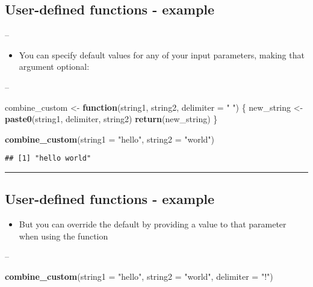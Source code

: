 \documentclass[]{article}
\newenvironment{Shaded}{\begin{snugshade}}{\end{snugshade}}
\newcommand{\ControlFlowTok}[1]{\textcolor[rgb]{0.13,0.29,0.53}{\textbf{#1}}}
\newcommand{\DataTypeTok}[1]{\textcolor[rgb]{0.13,0.29,0.53}{#1}}
\newcommand{\KeywordTok}[1]{\textcolor[rgb]{0.13,0.29,0.53}{\textbf{#1}}}
\newcommand{\NormalTok}[1]{#1}
\newcommand{\StringTok}[1]{\textcolor[rgb]{0.31,0.60,0.02}{#1}}
\providecommand{\tightlist}{%
  \setlength{\itemsep}{0pt}\setlength{\parskip}{0pt}}
\begin{document}
\hypertarget{user-defined-functions---example-2}{%
\subsection{User-defined functions -
example}\label{user-defined-functions---example-2}}

--

\begin{itemize}
\tightlist
\item
  You can specify default values for any of your input parameters,
  making that argument optional:
\end{itemize}

--

\begin{Shaded}
\begin{Highlighting}[]
\NormalTok{combine_custom <-}\StringTok{ }\ControlFlowTok{function}\NormalTok{(string1, string2, }\DataTypeTok{delimiter =} \StringTok{" "}\NormalTok{) \{}
\NormalTok{  new_string <-}\StringTok{ }\KeywordTok{paste0}\NormalTok{(string1, delimiter, string2)}
  \KeywordTok{return}\NormalTok{(new_string)}
\NormalTok{\}}

\KeywordTok{combine_custom}\NormalTok{(}\DataTypeTok{string1 =} \StringTok{"hello"}\NormalTok{, }\DataTypeTok{string2 =} \StringTok{"world"}\NormalTok{)}
\end{Highlighting}
\end{Shaded}

\begin{verbatim}
## [1] "hello world"
\end{verbatim}

\begin{center}\rule{0.5\linewidth}{\linethickness}\end{center}

\hypertarget{user-defined-functions---example-3}{%
\subsection{User-defined functions -
example}\label{user-defined-functions---example-3}}

\begin{itemize}
\tightlist
\item
  But you can override the default by providing a value to that
  parameter when using the function
\end{itemize}

--

\begin{Shaded}
\begin{Highlighting}[]
\KeywordTok{combine_custom}\NormalTok{(}\DataTypeTok{string1 =} \StringTok{"hello"}\NormalTok{,}
               \DataTypeTok{string2 =} \StringTok{"world"}\NormalTok{,}
               \DataTypeTok{delimiter =} \StringTok{"!"}\NormalTok{)}
\end{Highlighting}
\end{Shaded}
\end{document}

